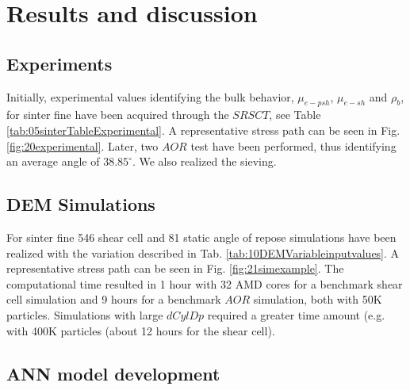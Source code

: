 \section{Results and discussion}
\label{sec:results}

\subsection{Experiments}
\label{subsec:experiments}

Initially, experimental values identifying the bulk behavior, $\mu_{e-psh}$, $\mu_{e-sh}$ and $\rho_{b}$, 
for sinter fine have been acquired through the $SRSCT$, see Table
\ref{tab:05sinterTableExperimental}.
A representative stress path can be seen in Fig. \ref{fig:20experimental}.
%
Later, two $AOR$ test have been performed, thus identifying an average angle of
$38.85 ^\circ$.
We also realized the sieving.


\subsection{DEM Simulations}
\label{subsec:simulations}

For sinter fine 546 shear cell and 81 static angle of repose simulations have
been realized with the variation described in Tab.
\ref{tab:10DEMVariableinputvalues}.
A representative stress path can be seen in Fig. \ref{fig:21simexample}.
The computational time resulted in 1 hour with 32 AMD cores for a benchmark
shear cell simulation and 9 hours for a benchmark $AOR$ simulation, both with 50K particles. 
Simulations with large $dCylDp$ required a greater time amount (e.g. with 400K
particles (about 12 hours for the shear cell). \\


\subsection{ANN model development}
\label{subsec:annmodeldev}


